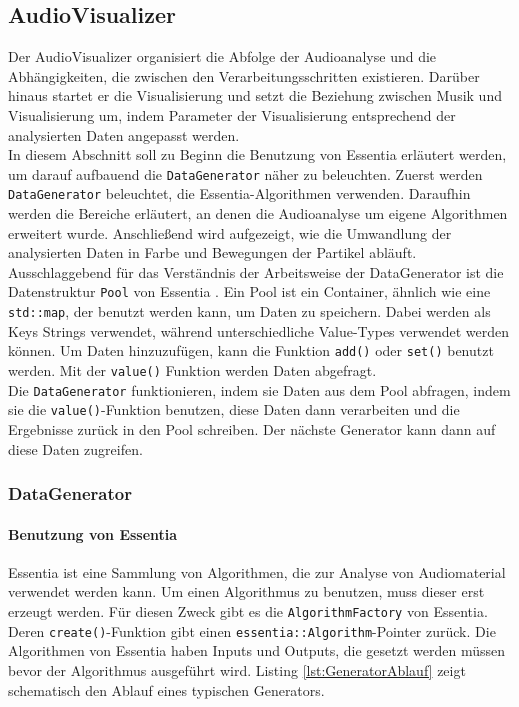 \documentclass[11pt,a4paper]{article}
\begin{document}
\subsection{AudioVisualizer}
Der AudioVisualizer organisiert die Abfolge der Audioanalyse und die Abhängigkeiten, die zwischen den Verarbeitungsschritten existieren. Darüber hinaus startet er die Visualisierung und setzt die Beziehung zwischen Musik und Visualisierung um, indem Parameter der Visualisierung entsprechend der analysierten Daten angepasst werden.\\
In diesem Abschnitt soll zu Beginn die Benutzung von Essentia erläutert werden, um darauf aufbauend die \lstinline!DataGenerator! näher zu beleuchten. Zuerst werden \lstinline!DataGenerator! beleuchtet, die Essentia-Algorithmen verwenden. Daraufhin werden die Bereiche erläutert, an denen die Audioanalyse um eigene Algorithmen erweitert wurde. Anschließend wird aufgezeigt, wie die Umwandlung der analysierten Daten in Farbe und Bewegungen der Partikel abläuft.\\
Ausschlaggebend für das Verständnis der Arbeitsweise der DataGenerator ist die Datenstruktur \lstinline!Pool! von Essentia \cite{EssentiaPool}. Ein Pool ist ein Container, ähnlich wie eine \lstinline!std::map!, der benutzt werden kann, um Daten zu speichern. Dabei werden als Keys Strings verwendet, während unterschiedliche Value-Types verwendet werden können. Um Daten hinzuzufügen, kann die Funktion \lstinline!add()! oder \lstinline!set()! benutzt werden. Mit der \lstinline!value()! Funktion werden Daten abgefragt.\\
Die \lstinline!DataGenerator! funktionieren, indem sie Daten aus dem Pool abfragen, indem sie die \lstinline!value()!-Funktion benutzen, diese Daten dann verarbeiten und die Ergebnisse zurück in den Pool schreiben. Der nächste Generator kann dann auf diese Daten zugreifen.

\subsubsection{DataGenerator}

\paragraph{Benutzung von Essentia}
Essentia ist eine Sammlung von Algorithmen, die zur Analyse von Audiomaterial verwendet werden kann. Um einen Algorithmus zu benutzen, muss dieser erst erzeugt werden. Für diesen Zweck gibt es die \lstinline!AlgorithmFactory! von Essentia. Deren \lstinline!create()!-Funktion gibt einen \lstinline!essentia::Algorithm!-Pointer zurück. Die Algorithmen von Essentia haben Inputs und Outputs, die gesetzt werden müssen bevor der Algorithmus ausgeführt wird. Listing \ref{lst:GeneratorAblauf} zeigt schematisch den Ablauf eines typischen Generators.
\end{document}
